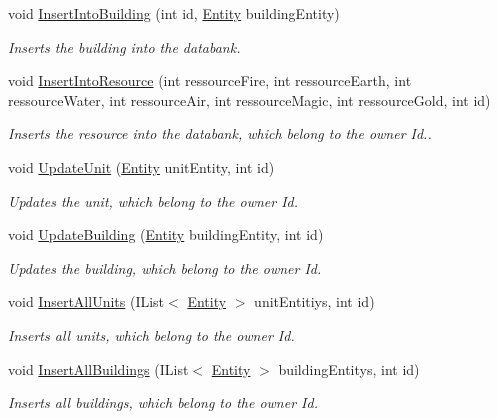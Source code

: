 \begin{DoxyCompactItemize}
void \hyperlink{classServer_1_1DB_1_1DBHandle_a8fbc59cc6602d140482f68f3477e4baf}{Insert\-Into\-Building} (int id, \hyperlink{classCore_1_1Models_1_1Entity}{Entity} building\-Entity)
\begin{DoxyCompactList}\small\item\em Inserts the building into the databank. \end{DoxyCompactList}\item 
void \hyperlink{classServer_1_1DB_1_1DBHandle_a34b8a21944a12dd60e3f95d49e174458}{Insert\-Into\-Resource} (int ressource\-Fire, int ressource\-Earth, int ressource\-Water, int ressource\-Air, int ressource\-Magic, int ressource\-Gold, int id)
\begin{DoxyCompactList}\small\item\em Inserts the resource into the databank, which belong to the owner Id.. \end{DoxyCompactList}\item 
void \hyperlink{classServer_1_1DB_1_1DBHandle_af9bdbff3aeab46d1632f447f99989557}{Update\-Unit} (\hyperlink{classCore_1_1Models_1_1Entity}{Entity} unit\-Entity, int id)
\begin{DoxyCompactList}\small\item\em Updates the unit, which belong to the owner Id. \end{DoxyCompactList}\item 
void \hyperlink{classServer_1_1DB_1_1DBHandle_aa32ad499307c7d70ff263c9136126aac}{Update\-Building} (\hyperlink{classCore_1_1Models_1_1Entity}{Entity} building\-Entity, int id)
\begin{DoxyCompactList}\small\item\em Updates the building, which belong to the owner Id. \end{DoxyCompactList}\item 
void \hyperlink{classServer_1_1DB_1_1DBHandle_a227b450add1e80fcf329e62b9464b5e6}{Insert\-All\-Units} (I\-List$<$ \hyperlink{classCore_1_1Models_1_1Entity}{Entity} $>$ unit\-Entitiys, int id)
\begin{DoxyCompactList}\small\item\em Inserts all units, which belong to the owner Id. \end{DoxyCompactList}\item 
void \hyperlink{classServer_1_1DB_1_1DBHandle_ab7d27c190063a6cb8c6db0240c7c3dd1}{Insert\-All\-Buildings} (I\-List$<$ \hyperlink{classCore_1_1Models_1_1Entity}{Entity} $>$ building\-Entitys, int id)
\begin{DoxyCompactList}\small\item\em Inserts all buildings, which belong to the owner Id. \end{DoxyCompactList}\item 

\end{DoxyCompactItemize}
